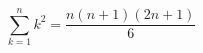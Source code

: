 \begin{equation}
    \label{eq:sum-k-pow-2}
    \sum_{k=1}^{n} k^2 = \dfrac{n(n+1)(2n+1)}{6}
\end{equation}
